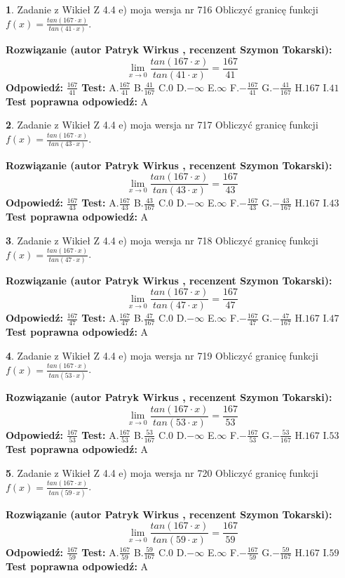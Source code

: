 \documentclass[12pt, a4paper]{article}
\theoremstyle{definition} %
\newtheorem{zad}{}
\newcommand{\zadStart}[1]{\begin{zad}#1\newline}
\newcommand{\zadStop}{\end{zad}}
\newcommand{\rozwStart}[2]{\noindent \textbf{Rozwiązanie (autor #1 , recenzent #2): }\newline}
\newcommand{\rozwStop}{\newline}
\newcommand{\odpStart}{\noindent \textbf{Odpowiedź:}\newline}
\newcommand{\odpStop}{\newline}
\newcommand{\testStart}{\noindent \textbf{Test:}\newline}
\newcommand{\testStop}{\newline}
\newcommand{\kluczStart}{\noindent \textbf{Test poprawna odpowiedź:}\newline}
\newcommand{\kluczStop}{\newline}
\begin{document}
\zadStart{Zadanie z Wikieł Z 4.4 e) moja wersja nr 716}
Obliczyć granicę funkcji $f(x)=\frac{tan(167\cdot x)}{tan(41\cdot x)}$.
\zadStop
\rozwStart{Patryk Wirkus}{Szymon Tokarski}
$$\lim\limits_{x\to 0}\frac{tan(167\cdot x)}{tan(41\cdot x)}=
\frac{167}{41}$$
\rozwStop
\odpStart
$\frac{167}{41}$
\odpStop
\testStart
A.$\frac{167}{41}$
B.$\frac{41}{167}$
C.$0$
D.$-\infty$
E.$\infty$
F.$-\frac{167}{41}$
G.$-\frac{41}{167}$
H.$167$
I.$41$
\testStop
\kluczStart
A
\kluczStop



\zadStart{Zadanie z Wikieł Z 4.4 e) moja wersja nr 717}
Obliczyć granicę funkcji $f(x)=\frac{tan(167\cdot x)}{tan(43\cdot x)}$.
\zadStop
\rozwStart{Patryk Wirkus}{Szymon Tokarski}
$$\lim\limits_{x\to 0}\frac{tan(167\cdot x)}{tan(43\cdot x)}=
\frac{167}{43}$$
\rozwStop
\odpStart
$\frac{167}{43}$
\odpStop
\testStart
A.$\frac{167}{43}$
B.$\frac{43}{167}$
C.$0$
D.$-\infty$
E.$\infty$
F.$-\frac{167}{43}$
G.$-\frac{43}{167}$
H.$167$
I.$43$
\testStop
\kluczStart
A
\kluczStop



\zadStart{Zadanie z Wikieł Z 4.4 e) moja wersja nr 718}
Obliczyć granicę funkcji $f(x)=\frac{tan(167\cdot x)}{tan(47\cdot x)}$.
\zadStop
\rozwStart{Patryk Wirkus}{Szymon Tokarski}
$$\lim\limits_{x\to 0}\frac{tan(167\cdot x)}{tan(47\cdot x)}=
\frac{167}{47}$$
\rozwStop
\odpStart
$\frac{167}{47}$
\odpStop
\testStart
A.$\frac{167}{47}$
B.$\frac{47}{167}$
C.$0$
D.$-\infty$
E.$\infty$
F.$-\frac{167}{47}$
G.$-\frac{47}{167}$
H.$167$
I.$47$
\testStop
\kluczStart
A
\kluczStop



\zadStart{Zadanie z Wikieł Z 4.4 e) moja wersja nr 719}
Obliczyć granicę funkcji $f(x)=\frac{tan(167\cdot x)}{tan(53\cdot x)}$.
\zadStop
\rozwStart{Patryk Wirkus}{Szymon Tokarski}
$$\lim\limits_{x\to 0}\frac{tan(167\cdot x)}{tan(53\cdot x)}=
\frac{167}{53}$$
\rozwStop
\odpStart
$\frac{167}{53}$
\odpStop
\testStart
A.$\frac{167}{53}$
B.$\frac{53}{167}$
C.$0$
D.$-\infty$
E.$\infty$
F.$-\frac{167}{53}$
G.$-\frac{53}{167}$
H.$167$
I.$53$
\testStop
\kluczStart
A
\kluczStop



\zadStart{Zadanie z Wikieł Z 4.4 e) moja wersja nr 720}
Obliczyć granicę funkcji $f(x)=\frac{tan(167\cdot x)}{tan(59\cdot x)}$.
\zadStop
\rozwStart{Patryk Wirkus}{Szymon Tokarski}
$$\lim\limits_{x\to 0}\frac{tan(167\cdot x)}{tan(59\cdot x)}=
\frac{167}{59}$$
\rozwStop
\odpStart
$\frac{167}{59}$
\odpStop
\testStart
A.$\frac{167}{59}$
B.$\frac{59}{167}$
C.$0$
D.$-\infty$
E.$\infty$
F.$-\frac{167}{59}$
G.$-\frac{59}{167}$
H.$167$
I.$59$
\testStop
\kluczStart
A
\kluczStop
\end{document}
